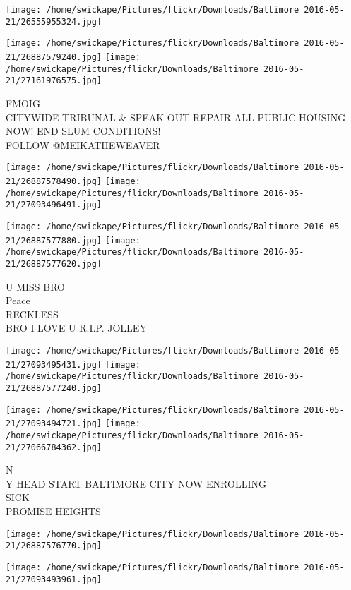 \documentclass[10pt,letterpaper]{article}
\begin{document}
\texttt{[image: /home/swickape/Pictures/flickr/Downloads/Baltimore 2016-05-21/26555955324.jpg]}

\vspace{0.25in}
\texttt{[image: /home/swickape/Pictures/flickr/Downloads/Baltimore 2016-05-21/26887579240.jpg]}
\texttt{[image: /home/swickape/Pictures/flickr/Downloads/Baltimore 2016-05-21/27161976575.jpg]}

FMOIG\\
CITYWIDE TRIBUNAL \& SPEAK OUT REPAIR ALL PUBLIC HOUSING NOW!  END SLUM CONDITIONS!\\
FOLLOW @MEIKATHEWEAVER
\pagebreak

\texttt{[image: /home/swickape/Pictures/flickr/Downloads/Baltimore 2016-05-21/26887578490.jpg]}
\texttt{[image: /home/swickape/Pictures/flickr/Downloads/Baltimore 2016-05-21/27093496491.jpg]}

\texttt{[image: /home/swickape/Pictures/flickr/Downloads/Baltimore 2016-05-21/26887577880.jpg]}
\texttt{[image: /home/swickape/Pictures/flickr/Downloads/Baltimore 2016-05-21/26887577620.jpg]}

U MISS BRO\\
Peace\\
RECKLESS\\
BRO I LOVE U R.I.P. JOLLEY
\pagebreak

\texttt{[image: /home/swickape/Pictures/flickr/Downloads/Baltimore 2016-05-21/27093495431.jpg]}
\texttt{[image: /home/swickape/Pictures/flickr/Downloads/Baltimore 2016-05-21/26887577240.jpg]}

\texttt{[image: /home/swickape/Pictures/flickr/Downloads/Baltimore 2016-05-21/27093494721.jpg]}
\texttt{[image: /home/swickape/Pictures/flickr/Downloads/Baltimore 2016-05-21/27066784362.jpg]}

N\\
Y HEAD START BALTIMORE CITY NOW ENROLLING\\
SICK\\
PROMISE HEIGHTS
\pagebreak

\texttt{[image: /home/swickape/Pictures/flickr/Downloads/Baltimore 2016-05-21/26887576770.jpg]}

\vspace{0.25in}
\texttt{[image: /home/swickape/Pictures/flickr/Downloads/Baltimore 2016-05-21/27093493961.jpg]}
\end{document}
